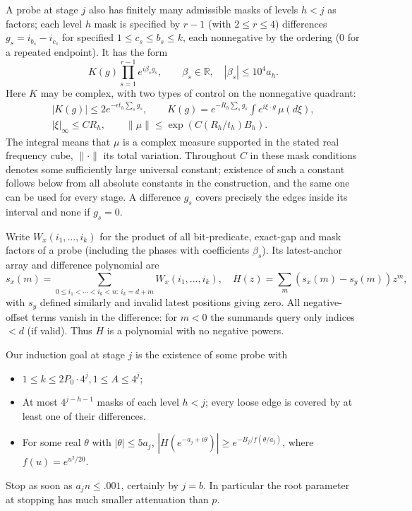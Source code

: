 \documentclass[11pt]{article}
\begin{document}
A probe at stage \(j\) also has finitely many admissible masks of levels \(h<j\) as factors; each level \(h\) mask is specified by \(r-1\) (with \(2\le r\le4\)) differences \(g_s=i_{b_s}-i_{c_s}\) for specified \(1\le c_s\le b_s\le k\), each nonnegative by the ordering (0 for a repeated endpoint). It has the form
\[
K(g)\prod_{s=1}^{r-1} e^{i\beta_s g_s},\qquad \beta_s\in\mathbb R,\quad |\beta_s|\le10^4 a_h .
\]
Here \(K\) may be complex, with two types of control on the nonnegative quadrant:
\[
\begin{gathered}
 |K(g)|\le 2 e^{-\epsilon t_h\sum_s g_s},\qquad
 K(g)=e^{-R_h\sum_s g_s}\int e^{i\xi\cdot g}\,\mu(d\xi),\\
 |\xi|_\infty\le C R_h,\qquad \|\mu\|\le \exp(C (R_h/t_h) B_h).
\end{gathered}
\]
The integral means that \(\mu\) is a complex measure supported in the stated real frequency cube, \(\|\cdot\|\) its total variation. Throughout \(C\) in these mask conditions denotes some sufficiently large universal constant; existence of such a constant follows below from all absolute constants in the construction, and the same one can be used for every stage. A difference \(g_s\) covers precisely the edges inside its interval and none if \(g_s=0\).

Write \(W_x(i_1,\ldots,i_k)\) for the product of all bit-predicate, exact-gap and mask factors of a probe (including the phases with coefficients \(\beta_s\)). Its latest-anchor array and difference polynomial are
\[
 s_x(m)=\sum_{0\le i_1<\cdots<i_k<n:\ i_k=d+m} W_x(i_1,\ldots,i_k),
\quad H(z)=\sum_m(s_x(m)-s_y(m)) z^m ,
\]
with \(s_y\) defined similarly and invalid latest positions giving zero. All negative-offset terms vanish in the difference: for \(m<0\) the summands query only indices \(<d\) (if valid). Thus \(H\) is a polynomial with no negative powers.

Our induction goal at stage $j$ is the existence of some probe with
\begin{itemize}
\item \(1\le k\le 2P_0\cdot 4^j, 1\le A\le4^j\);
\item At most \(4^{j-h-1}\) masks of each level \(h<j\); every loose edge is covered by at least one of their differences.
\item For some real \(\theta\) with \(|\theta|\le5a_j\), \(|H(e^{-a_j+i\theta})|\ge e^{-B_j/f(\theta/a_j)}\), where \(f(u)=e^{u^2/20}\).
\end{itemize}
Stop as soon as \(a_j n\le .001\), certainly by \(j=b\). In particular the root parameter at stopping has much smaller attenuation than \(p\).
\end{document}
